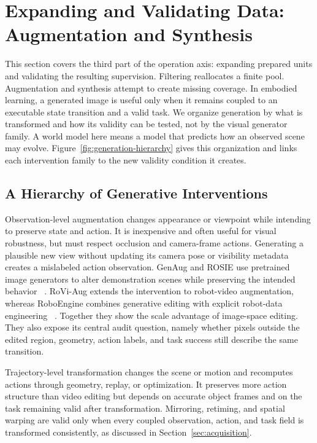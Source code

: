 \section{Expanding and Validating Data: Augmentation and Synthesis}
\label{sec:evolution}

This section covers the third part of the operation axis: expanding prepared units and validating the resulting supervision.
Filtering reallocates a finite pool.
Augmentation and synthesis attempt to create missing coverage.
In embodied learning, a generated image is useful only when it remains coupled to an executable state transition and a valid task.
We organize generation by what is transformed and how its validity can be tested, not by the visual generator family.
A world model here means a model that predicts how an observed scene may evolve.
Figure~\ref{fig:generation-hierarchy} gives this organization and links each intervention family to the new validity condition it creates.



\subsection{A Hierarchy of Generative Interventions}

Observation-level augmentation changes appearance or viewpoint while intending to preserve state and action.
It is inexpensive and often useful for visual robustness, but must respect occlusion and camera-frame actions.
Generating a plausible new view without updating its camera pose or visibility metadata creates a mislabeled action observation.
GenAug and ROSIE use pretrained image generators to alter demonstration scenes while preserving the intended behavior ~\cite{chen2023genaug_2302_06671,yu2023scaling_2302_11550}.
RoVi-Aug extends the intervention to robot-video augmentation, whereas RoboEngine combines generative editing with explicit robot-data engineering ~\cite{chen2024rovi_2409_03403,yuan2025roboengine_2503_18738}.
Together they show the scale advantage of image-space editing.
They also expose its central audit question, namely whether pixels outside the edited region, geometry, action labels, and task success still describe the same transition.

Trajectory-level transformation changes the scene or motion and recomputes actions through geometry, replay, or optimization.
It preserves more action structure than video editing but depends on accurate object frames and on the task remaining valid after transformation.
Mirroring, retiming, and spatial warping are valid only when every coupled observation, action, and task field is transformed consistently, as discussed in Section~\ref{sec:acquisition}.

